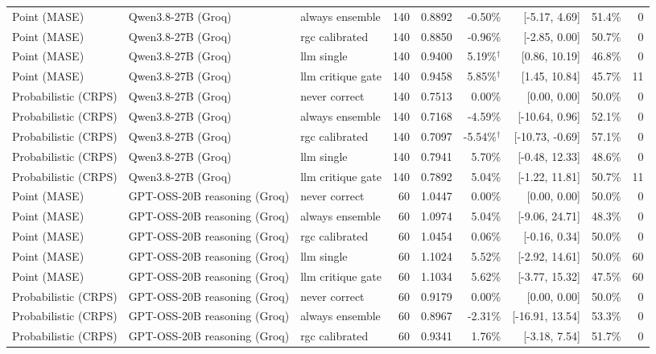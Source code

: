 \begin{tabular}{lllrrrrrr}
Point (MASE) & Qwen3.8-27B (Groq) & always ensemble & 140 & 0.8892 & -0.50\% & [-5.17, 4.69] & 51.4\% & 0 \\
Point (MASE) & Qwen3.8-27B (Groq) & rgc calibrated & 140 & 0.8850 & -0.96\% & [-2.85, 0.00] & 50.7\% & 0 \\
Point (MASE) & Qwen3.8-27B (Groq) & llm single & 140 & 0.9400 & 5.19\%$^\dagger$ & [0.86, 10.19] & 46.8\% & 0 \\
Point (MASE) & Qwen3.8-27B (Groq) & llm critique gate & 140 & 0.9458 & 5.85\%$^\dagger$ & [1.45, 10.84] & 45.7\% & 11 \\
Probabilistic (CRPS) & Qwen3.8-27B (Groq) & never correct & 140 & 0.7513 & 0.00\% & [0.00, 0.00] & 50.0\% & 0 \\
Probabilistic (CRPS) & Qwen3.8-27B (Groq) & always ensemble & 140 & 0.7168 & -4.59\% & [-10.64, 0.96] & 52.1\% & 0 \\
Probabilistic (CRPS) & Qwen3.8-27B (Groq) & rgc calibrated & 140 & 0.7097 & -5.54\%$^\dagger$ & [-10.73, -0.69] & 57.1\% & 0 \\
Probabilistic (CRPS) & Qwen3.8-27B (Groq) & llm single & 140 & 0.7941 & 5.70\% & [-0.48, 12.33] & 48.6\% & 0 \\
Probabilistic (CRPS) & Qwen3.8-27B (Groq) & llm critique gate & 140 & 0.7892 & 5.04\% & [-1.22, 11.81] & 50.7\% & 11 \\
Point (MASE) & GPT-OSS-20B reasoning (Groq) & never correct & 60 & 1.0447 & 0.00\% & [0.00, 0.00] & 50.0\% & 0 \\
Point (MASE) & GPT-OSS-20B reasoning (Groq) & always ensemble & 60 & 1.0974 & 5.04\% & [-9.06, 24.71] & 48.3\% & 0 \\
Point (MASE) & GPT-OSS-20B reasoning (Groq) & rgc calibrated & 60 & 1.0454 & 0.06\% & [-0.16, 0.34] & 50.0\% & 0 \\
Point (MASE) & GPT-OSS-20B reasoning (Groq) & llm single & 60 & 1.1024 & 5.52\% & [-2.92, 14.61] & 50.0\% & 60 \\
Point (MASE) & GPT-OSS-20B reasoning (Groq) & llm critique gate & 60 & 1.1034 & 5.62\% & [-3.77, 15.32] & 47.5\% & 60 \\
Probabilistic (CRPS) & GPT-OSS-20B reasoning (Groq) & never correct & 60 & 0.9179 & 0.00\% & [0.00, 0.00] & 50.0\% & 0 \\
Probabilistic (CRPS) & GPT-OSS-20B reasoning (Groq) & always ensemble & 60 & 0.8967 & -2.31\% & [-16.91, 13.54] & 53.3\% & 0 \\
Probabilistic (CRPS) & GPT-OSS-20B reasoning (Groq) & rgc calibrated & 60 & 0.9341 & 1.76\% & [-3.18, 7.54] & 51.7\% & 0 \\

\end{tabular}
